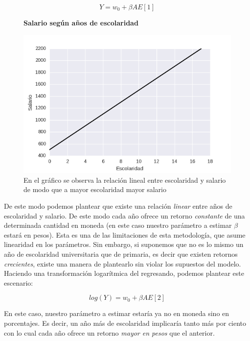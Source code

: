 $$Y = w_0 + \beta AE [1]$$ 

\begin{figure}[h]
		\centering
		\textbf{Salario según años de escolaridad}\par\medskip
		\includegraphics[scale = 0.7]{../img/capitulo2/modelo1.png}
		\caption{En el gráfico se observa la relación lineal entre escolaridad y salario de modo que a mayor escolaridad mayor salario}
\end{figure}

De este modo podemos plantear que existe una relación \textit{linear} entre años de escolaridad y salario. De este modo cada año ofrece un retorno \textit{constante} de una determinada cantidad en moneda (en este caso nuestro parámetro a estimar $\beta$ estará en pesos). Esta es una de las limitaciones de esta metodología, que asume linearidad en los parámetros. Sin embargo, si suponemos que no es lo mismo un año de escolaridad universitaria que de primaria, es decir que existen retornos \textit{crecientes}, existe una manera de plantearlo sin violar los supuestos del modelo. Haciendo una transformación logarítmica del regresando, podemos plantear este escenario:

$$log(Y) = w_0 + \beta AE [2]$$

En este caso, nuestro parámetro a estimar estaría ya no en moneda sino en porcentajes. Es decir, un año más de escolaridad implicaría tanto más por ciento con lo cual cada año ofrece un retorno \textit{mayor en pesos} que el anterior.


